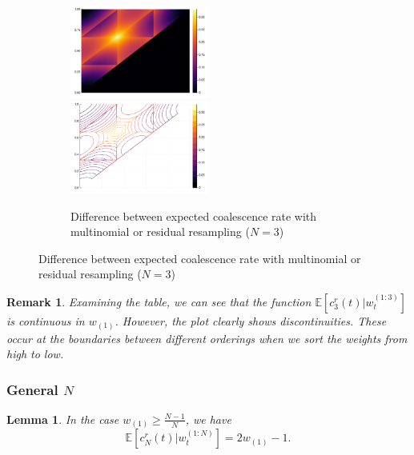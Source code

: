 \documentclass[fleqn]{article}
\newtheorem{lemma}{Lemma}
\newtheorem{remark}{Remark}
\theoremstyle{definition}
\newcommand{\E}{\mathbb{E}}
\newcommand{\wt}[2][t]{w_{#1}^{(#2)}}
\begin{document}
\begin{figure}
\begin{subfigure}{\textwidth}
	\end{subfigure}
	\begin{subfigure}{\textwidth}
		\includegraphics[width=0.5\textwidth]{../residual_resampling/plots/EcN_mn_res_diff_N3_heatmap.pdf}
		\includegraphics[width=0.5\textwidth]{../residual_resampling/plots/EcN_mn_res_diff_N3_contour.pdf}
	\caption{Difference between expected coalescence rate with multinomial or residual resampling ($N=3$)}
	\end{subfigure}
\end{figure}

\begin{remark}
Examining the table, we can see that the function $\E[c_3^r(t) |\wt{1:3}]$ is continuous in $w_{(1)}$. However, the plot clearly shows discontinuities. These occur at the boundaries between different orderings when we sort the weights from high to low.
\end{remark}

\subsubsection{General $N$}
\begin{lemma}
In the case $w_{(1)} \geq \frac{N-1}{N}$, we have 
\begin{equation*}
\E[c_N^r(t) |\wt{1:N}] = 2w_{(1)} -1.
\end{equation*}
\end{lemma}
\end{document}
